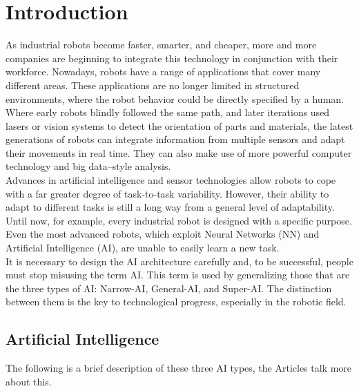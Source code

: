 
\chapter{Introduction} \label{cha:introduction}

As industrial robots become faster, smarter, and cheaper, more and more companies are beginning to integrate this technology in conjunction with their workforce. 
Nowadays, robots have a range of applications that cover many different areas. These applications are no longer limited in structured environments, where the robot behavior could be directly specified by a human. \\
Where early robots blindly followed the same path, and later iterations used lasers or vision systems to detect the orientation of parts and materials, the latest generations of robots can integrate information from multiple sensors and adapt their movements in real time. They can also make use of more powerful computer technology and big data–style analysis. \\
Advances in artificial intelligence and sensor technologies allow robots to cope with a far greater degree of task-to-task variability. However, their ability to adapt to different tasks is still a long way from a general level of adaptability. \\
Until now, for example, every industrial robot is designed with a specific purpose. Even the most advanced robots, which exploit Neural Networks (NN) and Artificial Intelligence (AI), are unable to easily learn a new task. \\
It is necessary to design the AI architecture carefully and, to be successful, people must stop misusing the term AI. This term is used by generalizing those that are the three types of AI: Narrow-AI, General-AI, and Super-AI. The distinction between them is the key to technological progress, especially in the robotic field. 


\section{Artificial Intelligence}\label{sec:ai}

The following is a brief description of these three AI types, the Articles \cite{davidson_2019, edi_weekly, lawtomated_2020, allan_2018, astute_solutions_2020} talk more about this. 

